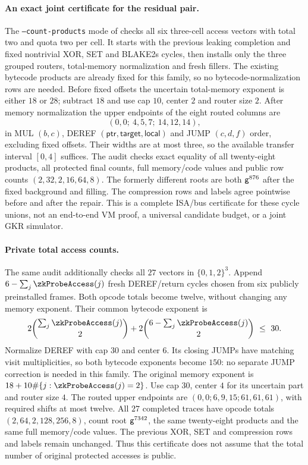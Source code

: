 \paragraph{An exact joint certificate for the residual pair.} The \texttt{--count-products} mode of  checks all six three-cell access vectors with total two and quota two per cell. It starts with the previous leaking completion and fixed nontrivial XOR, SET and BLAKE2s cycles, then installs only the three grouped routers, total-memory normalization and fresh fillers. The existing bytecode products are already fixed for this family, so no bytecode-normalization rows are needed. Before fixed offsets the uncertain total-memory exponent is either $18$ or $28$; subtract $18$ and use cap $10$, center $2$ and router size $2$. After memory normalization the upper endpoints of the eight routed columns are
\[
 (0,0;\ 4,5,7;\ 14,12,14),
\]
in MUL $(b,c)$, DEREF $(\mathsf{ptr},\mathsf{target},\mathsf{local})$ and JUMP $(c,d,f)$ order, excluding fixed offsets. Their widths are at most three, so the available transfer interval $[0,4]$ suffices. The audit checks exact equality of all twenty-eight products, all protected final counts, full memory/code values and public row counts $(2,32,2,16,64,8)$. The formerly different roots are both $\mathsf{g}^{876}$ after the fixed background and filling. The compression rows and labels agree pointwise before and after the repair. This is a complete ISA/bus certificate for these cycle unions, not an end-to-end VM proof, a universal candidate budget, or a joint GKR simulator.

\paragraph{Private total access counts.} The same audit additionally checks all $27$ vectors in $\{0,1,2\}^3$. Append $6-\sum_j\zkProbeAccess(j)$ fresh DEREF/return cycles chosen from six publicly preinstalled frames. Both opcode totals become twelve, without changing any memory exponent. Their common bytecode exponent is
\[
 2\binom{\sum_j\zkProbeAccess(j)}{2}
 +2\binom{6-\sum_j\zkProbeAccess(j)}{2}\ \le\ 30.
\]
Normalize DEREF with cap $30$ and center $6$. Its closing JUMPs have matching visit multiplicities, so both bytecode exponents become $150$: no separate JUMP correction is needed in this family. The original memory exponent is $18+10\#\{j:\zkProbeAccess(j)=2\}$. Use cap $30$, center $4$ for its uncertain part and router size $4$. The routed upper endpoints are $(0,0;6,9,15;61,61,61)$, with required shifts at most twelve. All $27$ completed traces have opcode totals $(2,64,2,128,256,8)$, count root $\mathsf{g}^{7342}$, the same twenty-eight products and the same full memory/code values. The previous XOR, SET and compression rows and labels remain unchanged. Thus this certificate does not assume that the total number of original protected accesses is public.

